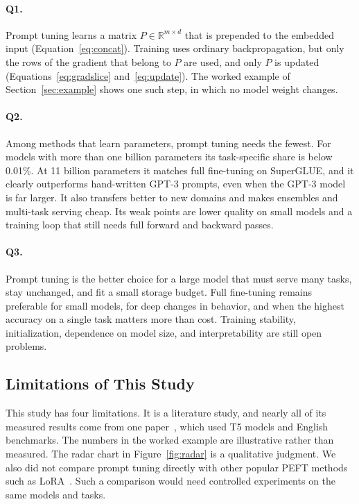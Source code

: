 \documentclass[12pt]{article}
\newcommand{\R}{\mathbb{R}}
\begin{document}
\paragraph{Q1.} Prompt tuning learns a matrix $P\in\R^{m\times d}$ that is prepended to the
embedded input (Equation~\eqref{eq:concat}). Training uses ordinary backpropagation, but only
the rows of the gradient that belong to $P$ are used, and only $P$ is updated
(Equations~\eqref{eq:gradslice} and~\eqref{eq:update}). The worked example of
Section~\ref{sec:example} shows one such step, in which no model weight changes.

\paragraph{Q2.} Among methods that learn parameters, prompt tuning needs the fewest. For
models with more than one billion parameters its task-specific share is below 0.01\%. At
11 billion parameters it matches full fine-tuning on SuperGLUE, and it clearly outperforms
hand-written GPT-3 prompts, even when the GPT-3 model is far larger. It also transfers better
to new domains and makes ensembles and multi-task serving cheap. Its weak points are lower
quality on small models and a training loop that still needs full forward and backward
passes.

\paragraph{Q3.} Prompt tuning is the better choice for a large model that must serve many
tasks, stay unchanged, and fit a small storage budget. Full fine-tuning remains preferable
for small models, for deep changes in behavior, and when the highest accuracy on a single
task matters more than cost. Training stability, initialization, dependence on model size,
and interpretability are still open problems.

\subsection{Limitations of This Study}\label{sec:limitations}

This study has four limitations. It is a literature study, and nearly all of its measured
results come from one paper~\cite{lester2021}, which used T5 models and English benchmarks.
The numbers in the worked example are illustrative rather than measured. The radar chart in
Figure~\ref{fig:radar} is a qualitative judgment. We also did not compare prompt tuning
directly with other popular PEFT methods such as LoRA~\cite{hu2022}. Such a comparison would
need controlled experiments on the same models and tasks.
\end{document}
